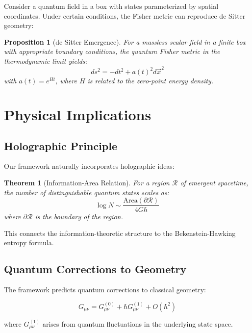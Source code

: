 \documentclass[12pt,a4paper]{article}
\newtheorem{theorem}{Theorem}
\newtheorem{proposition}{Proposition}
\begin{document}
Consider a quantum field in a box with states parameterized by spatial coordinates. Under certain conditions, the Fisher metric can reproduce de Sitter geometry:

\begin{proposition}[de Sitter Emergence]
For a massless scalar field in a finite box with appropriate boundary conditions, the quantum Fisher metric in the thermodynamic limit yields:
\begin{equation}
ds^2 = -dt^2 + a(t)^2 d\vec{x}^2
\end{equation}
with $a(t) = e^{Ht}$, where $H$ is related to the zero-point energy density.
\end{proposition}

\section{Physical Implications}

\subsection{Holographic Principle}

Our framework naturally incorporates holographic ideas:

\begin{theorem}[Information-Area Relation]
For a region $\mathcal{R}$ of emergent spacetime, the number of distinguishable quantum states scales as:
\begin{equation}
\log N \sim \frac{\text{Area}(\partial\mathcal{R})}{4G\hbar}
\end{equation}
where $\partial\mathcal{R}$ is the boundary of the region.
\end{theorem}

This connects the information-theoretic structure to the Bekenstein-Hawking entropy formula.

\subsection{Quantum Corrections to Geometry}

The framework predicts quantum corrections to classical geometry:

\begin{equation}
G_{\mu\nu} = G^{(0)}_{\mu\nu} + \hbar G^{(1)}_{\mu\nu} + O(\hbar^2)
\end{equation}

where $G^{(1)}_{\mu\nu}$ arises from quantum fluctuations in the underlying state space.
\end{document}
